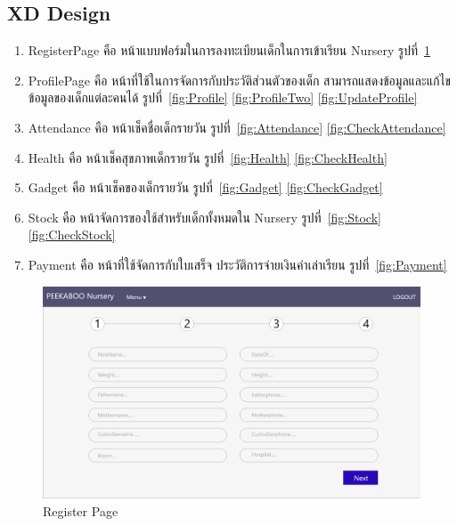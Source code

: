 \subsection{XD Design}
\begin{enumerate}
  \item RegisterPage คือ หน้าแบบฟอร์มในการลงทะเบียนเด็กในการเข้าเรียน Nursery รูปที่~\ref{fig:register}
  \item  ProfilePage  คือ หน้าที่ใช้ในการจัดการกับประวัติส่วนตัวของเด็ก สามารถแสดงข้อมูลและแก้ไขข้อมูลของเด็กแต่ละคนได้ รูปที่~\ref{fig:Profile} \ref{fig:ProfileTwo} \ref{fig:UpdateProfile}
  \item  Attendance คือ หน้าเช็คชื่อเด็กรายวัน รูปที่~\ref{fig:Attendance} \ref{fig:CheckAttendance}
  \item  Health คือ หน้าเช็คสุขภาพเด็กรายวัน รูปที่~\ref{fig:Health} \ref{fig:CheckHealth}
  \item  Gadget คือ หน้าเช็คของเด็กรายวัน รูปที่~\ref{fig:Gadget} \ref{fig:CheckGadget}
  \item  Stock คือ หน้าจัดการของใช้สำหรับเด็กทั้งหมดใน Nursery รูปที่~\ref{fig:Stock} \ref{fig:CheckStock}
  \item  Payment คือ หน้าที่ใช้จัดการกับใบเสร็จ  ประวัติการจ่ายเงินค่าเล่าเรียน รูปที่~\ref{fig:Payment}
\end{enumerate}

\begin{figure}
  \begin{center}
  \includegraphics[width=\linewidth]{images/registerPage.png}
  \end{center}
  \caption[Poem]{Register Page}
  \label{fig:register}
  \end{figure}

